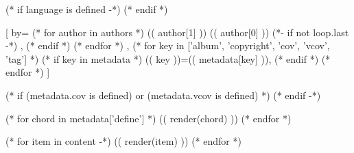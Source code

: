 

(* if language is defined -*)
(* endif *)

[
  by={
      (* for author in authors *)
        (( author[1] )) (( author[0] ))
        (*- if not loop.last -*)
        ,
        (* endif *)
      (* endfor *)
  },
  (* for key in ['album', 'copyright', 'cov', 'vcov', 'tag'] *)
  (* if key in metadata *)
  (( key ))={(( metadata[key] ))},
  (* endif *)
  (* endfor *)
]

(* if (metadata.cov is defined) or (metadata.vcov is defined) *)
\cover
(* endif -*)

(* for chord in metadata['define'] *)
  (( render(chord) ))
(* endfor *)

(* for item in content -*)
    (( render(item) ))
(* endfor *)

\endsong

